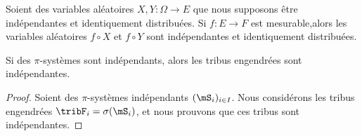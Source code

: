 \begin{lemma}       \label{LEMooWBAZooLVVRjO}
	Soient des variables aléatoires \( X,Y\colon \Omega\to E\) que nous supposons être indépendantes et identiquement distribuées. Si \( f\colon E\to F\) est mesurable,alors les variables aléatoires \( f\circ X\) et \( f\circ Y\) sont indépendantes et identiquement distribuées.
\end{lemma}


\begin{lemma}	\label{LEMooJBIVooXyPiDs}
	Si des \( \pi\)-systèmes sont indépendants, alors les tribus engendrées sont indépendantes.
\end{lemma}

\begin{proof}
	Soient des \( \pi\)-systèmes indépendants \( (\mS_i)_{i\in I}\). Nous considérons les tribus engendrées \( \tribF_i=\sigma(\mS_i)\), et nous prouvons que ces tribus sont indépendantes.


\end{proof}
